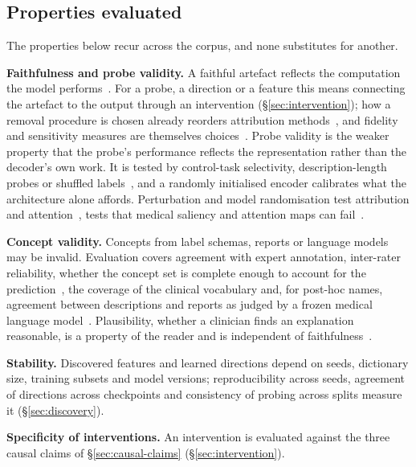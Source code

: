 \subsection{Properties evaluated}
\label{sec:eval-what}

The properties below recur across the corpus, and none substitutes for another.

\textbf{Faithfulness and probe validity.} A faithful artefact reflects the computation the model
performs~\cite{jacovi2020towards}. For a probe, a direction or a feature this means connecting the
artefact to the output through an intervention (\S\ref{sec:intervention}); how a removal procedure is
chosen already reorders attribution methods~\cite{hooker2019benchmark}, and fidelity and sensitivity
measures are themselves choices~\cite{yeh2019fidelity}. Probe validity is the weaker property that the
probe's performance reflects the representation rather than the decoder's own work. It is tested by
control-task selectivity, description-length probes or shuffled
labels~\cite{hewitt2019designing,voita2020information}, and a randomly initialised encoder calibrates what
the architecture alone affords. Perturbation and model randomisation test attribution and
attention~\cite{adebayo2018sanity}, tests that medical saliency and attention maps can
fail~\cite{arun2021trustworthiness,sadanandan2026attention}.

\textbf{Concept validity.} Concepts from label schemas, reports or language models may be invalid.
Evaluation covers agreement with expert annotation, inter-rater reliability, whether the concept set is
complete enough to account for the prediction~\cite{yeh2019completeness}, the coverage of the clinical
vocabulary and, for post-hoc names, agreement between descriptions and reports as judged by a frozen
medical language model~\cite{haque2026medconcept}. Plausibility, whether a clinician finds an
explanation reasonable, is a property of the reader and is independent of
faithfulness~\cite{jacovi2020towards,miller2017explanation}.

\textbf{Stability.} Discovered features and learned directions depend on seeds, dictionary size, training
subsets and model versions; reproducibility across seeds, agreement of directions across checkpoints and
consistency of probing across splits measure it (\S\ref{sec:discovery}).

\textbf{Specificity of interventions.} An intervention is evaluated against the three causal claims of
\S\ref{sec:causal-claims} (\S\ref{sec:intervention}).

